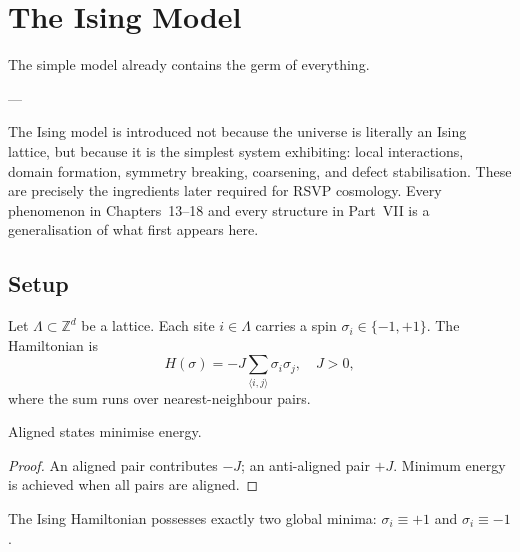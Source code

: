 
\chapter{The Ising Model}
\label{ch:ising}

\epigraph{%
  The simple model already contains the germ of everything.%
}{---}

\begin{WhyMatters}
  The Ising model is introduced not because the universe is
  literally an Ising lattice, but because it is the simplest
  system exhibiting: local interactions, domain formation,
  symmetry breaking, coarsening, and defect stabilisation.
  These are precisely the ingredients later required for
  RSVP cosmology.
  Every phenomenon in Chapters~13--18 and every structure in
  Part~VII is a generalisation of what first appears here.
\end{WhyMatters}

\section{Setup}

\begin{definition}
  Let $\Lambda \subset \mathbb{Z}^d$ be a lattice.
  Each site $i \in \Lambda$ carries a spin $\sigma_i \in \{-1,+1\}$.
  The Hamiltonian is
  \[
    H(\sigma) = -J \sum_{\langle i,j\rangle} \sigma_i\sigma_j,
    \quad J > 0,
  \]
  where the sum runs over nearest-neighbour pairs.
\end{definition}

\begin{proposition}
  Aligned states minimise energy.
\end{proposition}

\begin{proof}
  An aligned pair contributes $-J$; an anti-aligned pair $+J$.
  Minimum energy is achieved when all pairs are aligned.
\end{proof}

\begin{theorem}
  \label{thm:ising-ground}
  The Ising Hamiltonian possesses exactly two global minima:
  $\sigma_i \equiv +1$ and $\sigma_i \equiv -1$.
\end{theorem}

